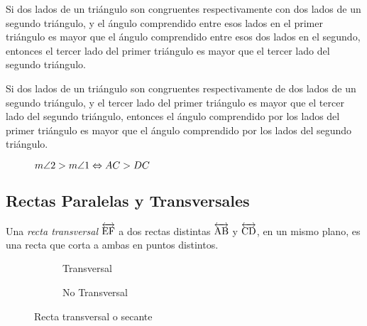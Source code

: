 \begin{theorem}
    Si dos lados de un triángulo son congruentes respectivamente con dos lados de un segundo triángulo, y el ángulo comprendido entre esos lados en el primer triángulo es mayor que el ángulo comprendido entre esos dos lados en el segundo, entonces el tercer lado del primer triángulo es mayor que el tercer lado del segundo triángulo.
\end{theorem}

\begin{theorem}
    Si dos lados de un triángulo son congruentes respectivamente de dos lados de un segundo triángulo, y el tercer lado del primer triángulo es mayor que el tercer lado del segundo triángulo, entonces el ángulo comprendido por los lados del primer triángulo es mayor que el ángulo comprendido por los lados del segundo triángulo.

    \begin{figure}[!h]
        \centering
        
        \caption{$m\angle{2} > m\angle{1} \Leftrightarrow AC > DC$}
        \label{fig:charnela-reciproco}
    \end{figure}
    
\end{theorem}

\clearpage

\subsection{Rectas Paralelas y Transversales}

\begin{definition}
    Una \textit{recta transversal} $\overleftrightarrow{\rm EF}$ a dos rectas distintas $\overleftrightarrow{\rm AB}$ y $\overleftrightarrow{\rm CD}$, en un mismo plano, es una recta que corta a ambas en puntos distintos.


    \begin{figure}[h!]

        \centering

        \begin{subfigure}[b]{.5\textwidth}
            \centering
            
            \label{fig:transversal}
            \caption{Transversal}
        \end{subfigure}%
        \begin{subfigure}[b]{.5\textwidth}
            \centering
            
            \label{fig:no-transversal}
            \caption{No Transversal}
        \end{subfigure}

        \centering
        \caption{Recta transversal o secante}
        \label{fig:transversal-line}
        
    \end{figure}        
    
\end{definition}

